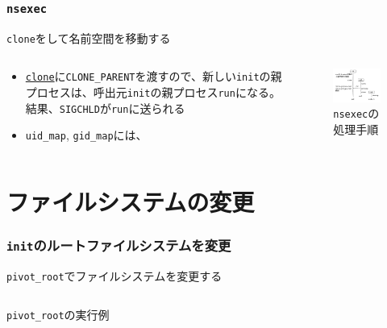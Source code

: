 \documentclass[unicode, 14pt, aspectratio=169]{beamer}
\begin{document}
\begin{frame}
  \frametitle{\texttt{nsexec}}
  \texttt{clone}をして名前空間を移動する
  \begin{columns}
    \begin{column}{0.5\textwidth}
      \begin{itemize}[leftmargin=0.8cm,label=$\circ$]
      \item \href{https://man7.org/linux/man-pages/man2/clone.2.html}{\texttt{clone}}に\texttt{CLONE\_PARENT}を渡すので、新しい\texttt{init}の親プロセスは、呼出元\texttt{init}の親プロセス\texttt{run}になる。結果、\texttt{SIGCHLD}が\texttt{run}に送られる
      \item \texttt{uid\_map}, \texttt{gid\_map}には、
      \end{itemize}
    \end{column}
    \begin{column}{0.5\textwidth}
      \begin{figure}
        \centering
        \includegraphics[width=7cm]{images/nsenter.drawio.pdf}
        \caption{\texttt{nsexec}の処理手順}
        \label{fig:nsenter}
      \end{figure}      
    \end{column}
  \end{columns}
\end{frame}
\section{ファイルシステムの変更}
\begin{frame}
  \frametitle{\texttt{init}のルートファイルシステムを変更}
  \texttt{pivot\_root}でファイルシステムを変更する
  \begin{center}
    \inputminted{sh}{code/pivot_root.sh}
    \texttt{pivot\_root}の実行例
  \end{center}
\end{frame}
\end{document}
